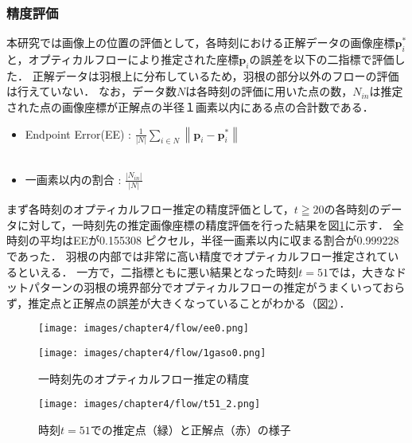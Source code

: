 \subsubsection*{精度評価}
本研究では画像上の位置の評価として，各時刻における正解データの画像座標$\mathbf{p}^{*}_{i}$と，オプティカルフローにより推定された座標$\mathbf{p}_i$の誤差を以下の二指標で評価した．
正解データは羽根上に分布しているため，羽根の部分以外のフローの評価は行えていない．
なお，データ数$N$は各時刻の評価に用いた点の数，$N_{in}$は推定された点の画像座標が正解点の半径１画素以内にある点の合計数である．
\begin{itemize}
	\item Endpoint Error(EE) : $\displaystyle \frac{1}{|{N}|} \sum_{{i} \in {N}}\left\|\mathbf{p}_{{i}}-\mathbf{p}_i^*\right\|$
	\\
	\\
	\item 一画素以内の割合 : $\displaystyle \frac{|{N_{in}}|}{|{N}|}$
\end{itemize}
まず各時刻のオプティカルフロー推定の精度評価として，$t\geqq20$の各時刻のデータに対して，一時刻先の推定画像座標の精度評価を行った結果を図\ref{fig:of_eval0}に示す．
全時刻の平均はEEが0.155308 ピクセル，半径一画素以内に収まる割合が0.999228 であった．
羽根の内部では非常に高い精度でオプティカルフロー推定されているといえる．
一方で，二指標ともに悪い結果となった時刻$t=51$では，大きなドットパターンの羽根の境界部分でオプティカルフローの推定がうまくいっておらず，推定点と正解点の誤差が大きくなっていることがわかる（図\ref{fig:t51}）．

\begin{figure}[H]
	\centering
	\begin{minipage}[b]{0.45\hsize}
		\centering
		\texttt{[image: images/chapter4/flow/ee0.png]}
		\label{fig:ee0}
	\end{minipage}
	\begin{minipage}[b]{0.45\hsize}
		\centering
		\texttt{[image: images/chapter4/flow/1gaso0.png]}
		\label{fig:1gaso0}
	\end{minipage}
	\caption{一時刻先のオプティカルフロー推定の精度}
	\label{fig:of_eval0}
\end{figure}
\begin{figure}[H]
	\centering
	\texttt{[image: images/chapter4/flow/t51\_2.png]}
	\caption[時刻$t=51$での推定点と正解点]{時刻$t=51$での推定点（緑）と正解点（赤）の様子}
	\label{fig:t51}
\end{figure}

